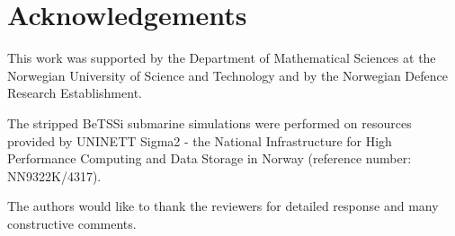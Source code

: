 \section*{Acknowledgements}
This work was supported by the Department of Mathematical Sciences at the Norwegian University of Science and Technology and by the Norwegian Defence Research Establishment.

The stripped BeTSSi submarine simulations were performed on resources provided by UNINETT Sigma2 - the National Infrastructure
for High Performance Computing and Data Storage in Norway (reference number: NN9322K/4317).

The authors would like to thank the reviewers for detailed response and many constructive comments.
